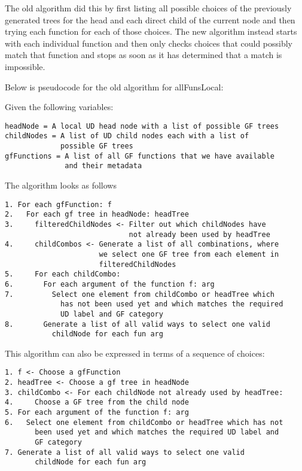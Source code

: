 The old algorithm did this by first listing all possible choices of the previously generated trees for the head and each direct child of the current node and then trying each function for each of those choices. The new algorithm instead starts with each individual function and then only checks choices that could possibly match that function and stops as soon as it has determined that a match is impossible.

Below is pseudocode for the old algorithm for allFunsLocal:

Given the following variables:
\begin{verbatim}
headNode = A local UD head node with a list of possible GF trees
childNodes = A list of UD child nodes each with a list of
             possible GF trees
gfFunctions = A list of all GF functions that we have available
              and their metadata
\end{verbatim}


The algorithm looks as follows
\begin{verbatim}
1. For each gfFunction: f
2.   For each gf tree in headNode: headTree
3.     filteredChildNodes <- Filter out which childNodes have
                             not already been used by headTree
4.     childCombos <- Generate a list of all combinations, where
                      we select one GF tree from each element in
                      filteredChildNodes
5.     For each childCombo:
6.       For each argument of the function f: arg
7.         Select one element from childCombo or headTree which
             has not been used yet and which matches the required
             UD label and GF category
8.       Generate a list of all valid ways to select one valid
           childNode for each fun arg
\end{verbatim}

This algorithm can also be expressed in terms of a sequence of choices:
\begin{verbatim}
1. f <- Choose a gfFunction
2. headTree <- Choose a gf tree in headNode
3. childCombo <- For each childNode not already used by headTree:
4.     Choose a GF tree from the child node
5. For each argument of the function f: arg
6.   Select one element from childCombo or headTree which has not
       been used yet and which matches the required UD label and
       GF category
7. Generate a list of all valid ways to select one valid
       childNode for each fun arg
\end{verbatim}


